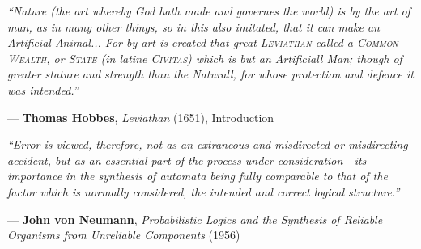 \documentclass[11pt,a4paper,twoside]{article}
\begin{document}
\clearpage\thispagestyle{empty}\pagecolor{hhpaper}\color{hhink}
\vspace*{\fill}
\noindent\begin{minipage}{0.95\textwidth}\normalsize\itshape
``Nature (the art whereby God hath made and governes the world) is by the art of man, as in many other things, so in this also imitated, that it can make an Artificial Animal... For by art is created that great \textsc{Leviathan} called a \textsc{Common-Wealth}, or \textsc{State} (in latine \textsc{Civitas}) which is but an Artificiall Man; though of greater stature and strength than the Naturall, for whose protection and defence it was intended.''
\par\vspace{7pt}
\raggedleft\upshape\small--- \textbf{Thomas Hobbes}, \emph{Leviathan} (1651), Introduction
\end{minipage}

\vspace{1.1cm}

\noindent\begin{minipage}{0.95\textwidth}\normalsize\itshape
``Error is viewed, therefore, not as an extraneous and misdirected or misdirecting accident, but as an essential part of the process under consideration---its importance in the synthesis of automata being fully comparable to that of the factor which is normally considered, the intended and correct logical structure.''
\par\vspace{7pt}
\raggedleft\upshape\small--- \textbf{John von Neumann}, \emph{Probabilistic Logics and the Synthesis of Reliable Organisms from Unreliable Components} (1956)
\end{minipage}
\vspace*{\fill}
\clearpage
\nopagecolor\color{hhink}
\end{document}
